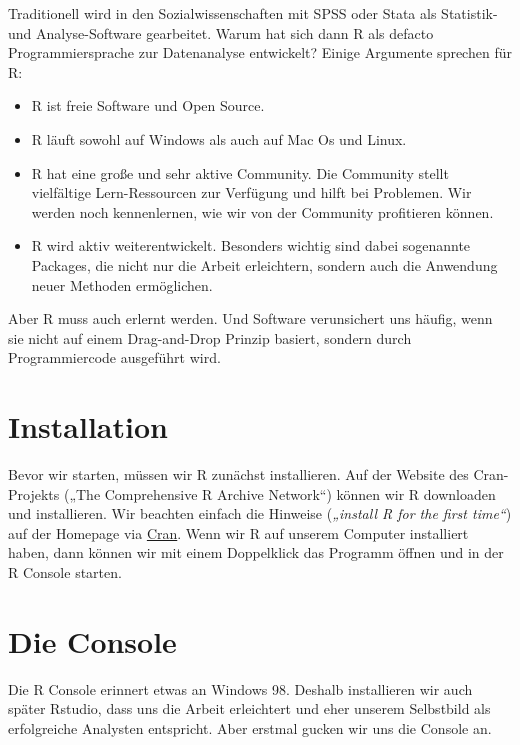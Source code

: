 \documentclass[
]{book}
\providecommand{\tightlist}{%
  \setlength{\itemsep}{0pt}\setlength{\parskip}{0pt}}
\begin{document}
Traditionell wird in den Sozialwissenschaften mit SPSS oder Stata als Statistik- und Analyse-Software gearbeitet. Warum hat sich dann R als defacto Programmiersprache zur Datenanalyse entwickelt? Einige Argumente sprechen für R:

\begin{itemize}
\tightlist
\item
  R ist freie Software und Open Source.
\item
  R läuft sowohl auf Windows als auch auf Mac Os und Linux.
\item
  R hat eine große und sehr aktive Community. Die Community stellt vielfältige Lern-Ressourcen zur Verfügung und hilft bei Problemen. Wir werden noch kennenlernen, wie wir von der Community profitieren können.
\item
  R wird aktiv weiterentwickelt. Besonders wichtig sind dabei sogenannte Packages, die nicht nur die Arbeit erleichtern, sondern auch die Anwendung neuer Methoden ermöglichen.
\end{itemize}

Aber R muss auch erlernt werden. Und Software verunsichert uns häufig, wenn sie nicht auf einem Drag-and-Drop Prinzip basiert, sondern durch Programmiercode ausgeführt wird.

\hypertarget{installation}{%
\section{Installation}\label{installation}}

Bevor wir starten, müssen wir R zunächst installieren. Auf der Website des Cran-Projekts („The Comprehensive R Archive Network``) können wir R downloaden und installieren. Wir beachten einfach die Hinweise (\emph{„install R for the first time``}) auf der Homepage via \href{https://cran.r-project.org/}{Cran}. Wenn wir R auf unserem Computer installiert haben, dann können wir mit einem Doppelklick das Programm öffnen und in der R Console starten.

\hypertarget{die-console}{%
\section{Die Console}\label{die-console}}

Die R Console erinnert etwas an Windows 98. Deshalb installieren wir auch später Rstudio, dass uns die Arbeit erleichtert und eher unserem Selbstbild als erfolgreiche Analysten entspricht. Aber erstmal gucken wir uns die Console an.
\end{document}
